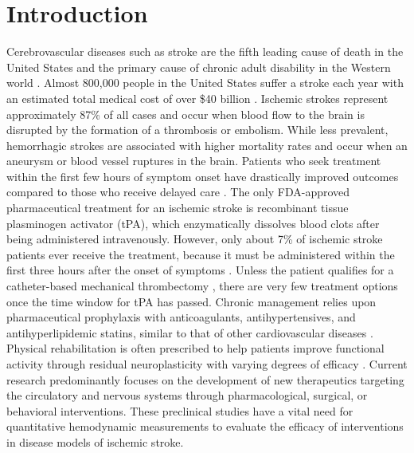 
\chapter{Introduction}

Cerebrovascular diseases such as stroke are the fifth leading cause of death in the United States and the primary cause of chronic adult disability in the Western world \cite{Kochanek:ut}. Almost 800,000 people in the United States suffer a stroke each year with an estimated total medical cost of over \$40 billion \cite{Benjamin:2018gy}. Ischemic strokes represent approximately 87\% of all cases and occur when blood flow to the brain is disrupted by the formation of a thrombosis or embolism. While less prevalent, hemorrhagic strokes are associated with higher mortality rates \cite{Andersen:2009ih} and occur when an aneurysm or blood vessel ruptures in the brain. Patients who seek treatment within the first few hours of symptom onset have drastically improved outcomes compared to those who receive delayed care \cite{Hacke:2004kf}. The only FDA-approved pharmaceutical treatment for an ischemic stroke is recombinant tissue plasminogen activator (tPA), which enzymatically dissolves blood clots after being administered intravenously. However, only about 7\% of ischemic stroke patients ever receive the treatment, because it must be administered within the first three hours after the onset of symptoms \cite{Schwamm:2013bs}. Unless the patient qualifies for a catheter-based mechanical thrombectomy \cite{Smith:2008dd}, there are very few treatment options once the time window for tPA has passed. Chronic management relies upon pharmaceutical prophylaxis with anticoagulants, antihypertensives, and antihyperlipidemic statins, similar to that of other cardiovascular diseases \cite{StrokePreventioninAtrialFibrillationInvestigators:1991fl, TheStrokeCouncil:2004bi, Endres:2005bg}. Physical rehabilitation is often prescribed to help patients improve functional activity through residual neuroplasticity with varying degrees of efficacy \cite{Jette:2005ii, French:2010ka, Takeuchi:2013ce, French:2016hk}. Current research predominantly focuses on the development of new therapeutics targeting the circulatory and nervous systems through pharmacological, surgical, or behavioral interventions. These preclinical studies have a vital need for quantitative hemodynamic measurements to evaluate the efficacy of interventions in disease models of ischemic stroke.

